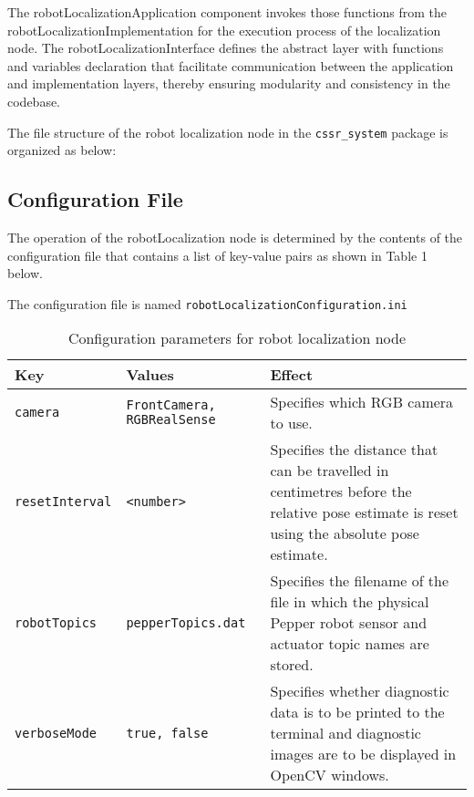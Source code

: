\documentclass{CSSRforAfrica}
\renewcommand{\DTstyle}{\footnotesize\sffamily}
\begin{document}
The robotLocalizationApplication component invokes those functions from the robotLocalizationImplementation for the execution process of the localization node. The robotLocalizationInterface defines the abstract layer with functions and variables declaration that facilitate communication between the application and implementation layers, thereby ensuring modularity and consistency in the codebase.

The file structure of the robot localization node in the \texttt{cssr\_system} package is organized as below:

\vspace*{0.5em}

\renewcommand*\DTstyle{\ttfamily}

\subsection{Configuration File}
The operation of the robotLocalization node is determined by the contents of the configuration file that contains a list of key-value pairs as shown in Table 1 below. 

The configuration file is named \texttt{robotLocalizationConfiguration.ini}

\begin{table}[H]
\centering
\caption{Configuration parameters for robot localization node}
\label{tab:robotLocalizationConfiguration}
\begin{tabularx}{\textwidth}{|l|l|X|}
\hline
\textbf{Key} & \textbf{Values} & \textbf{Effect} \\ \hline
\verb|camera| & \verb|FrontCamera, RGBRealSense| & Specifies which RGB camera to use. \\ \hline
\verb|resetInterval| & \verb|<number>| & Specifies the distance that can be travelled in centimetres before the relative pose estimate is reset using the absolute pose estimate. \\ \hline
\verb|robotTopics| & \verb|pepperTopics.dat| & Specifies the filename of the file in which the physical Pepper robot sensor and actuator topic names are stored. \\ \hline
\verb|verboseMode| & \verb|true, false| & Specifies whether diagnostic data is to be printed to the terminal and diagnostic images are to be displayed in OpenCV windows. \\ \hline
\end{tabularx}
\end{table}
\end{document}
